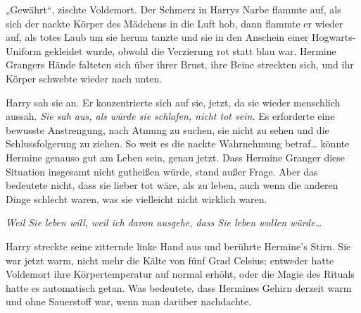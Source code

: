 „Gewährt“, zischte Voldemort.
Der Schmerz in Harrys Narbe flammte auf, als sich der nackte Körper des Mädchens in die Luft hob, dann flammte er wieder auf, als totes Laub um sie herum tanzte und sie in den Anschein einer Hogwarts-Uniform gekleidet wurde, obwohl die Verzierung rot statt blau war. Hermine Grangers Hände falteten sich über ihrer Brust, ihre Beine streckten sich, und ihr Körper schwebte wieder nach unten.

Harry sah sie an. Er konzentrierte sich auf sie, jetzt, da sie wieder menschlich aussah.
\emph{Sie sah aus, als würde sie schlafen, nicht tot sein.} Es erforderte eine bewusste Anstrengung, nach Atmung zu suchen, sie nicht zu sehen und die Schlussfolgerung zu ziehen. So weit es die nackte Wahrnehmung betraf… könnte Hermine genauso gut am Leben sein, genau jetzt.
Dass Hermine Granger diese Situation insgesamt nicht gutheißen würde, stand außer Frage. Aber das bedeutete nicht, dass sie lieber tot wäre, als zu leben, auch wenn die anderen Dinge schlecht waren, was sie vielleicht nicht wirklich waren.

\emph{Weil Sie leben will, weil ich davon ausgehe, dass Sie leben wollen würde…}

Harry streckte seine zitternde linke Hand aus und berührte Hermine’s Stirn. Sie war jetzt warm, nicht mehr die Kälte von fünf Grad Celsius; entweder hatte Voldemort ihre Körpertemperatur auf normal erhöht, oder die Magie des Rituals hatte es automatisch getan. Was bedeutete, dass Hermines Gehirn derzeit warm und ohne Sauerstoff war, wenn man darüber nachdachte.

